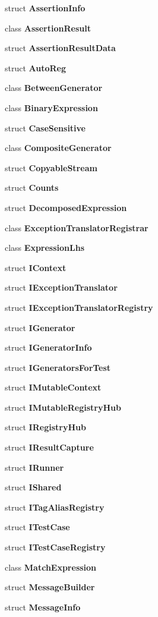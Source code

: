 \begin{DoxyCompactItemize}
\item 
struct \textbf{ Assertion\+Info}
\item 
class \textbf{ Assertion\+Result}
\item 
struct \textbf{ Assertion\+Result\+Data}
\item 
struct \textbf{ Auto\+Reg}
\item 
class \textbf{ Between\+Generator}
\item 
class \textbf{ Binary\+Expression}
\item 
struct \textbf{ Case\+Sensitive}
\item 
class \textbf{ Composite\+Generator}
\item 
struct \textbf{ Copyable\+Stream}
\item 
struct \textbf{ Counts}
\item 
struct \textbf{ Decomposed\+Expression}
\item 
class \textbf{ Exception\+Translator\+Registrar}
\item 
class \textbf{ Expression\+Lhs}
\item 
struct \textbf{ I\+Context}
\item 
struct \textbf{ I\+Exception\+Translator}
\item 
struct \textbf{ I\+Exception\+Translator\+Registry}
\item 
struct \textbf{ I\+Generator}
\item 
struct \textbf{ I\+Generator\+Info}
\item 
struct \textbf{ I\+Generators\+For\+Test}
\item 
struct \textbf{ I\+Mutable\+Context}
\item 
struct \textbf{ I\+Mutable\+Registry\+Hub}
\item 
struct \textbf{ I\+Registry\+Hub}
\item 
struct \textbf{ I\+Result\+Capture}
\item 
struct \textbf{ I\+Runner}
\item 
struct \textbf{ I\+Shared}
\item 
struct \textbf{ I\+Tag\+Alias\+Registry}
\item 
struct \textbf{ I\+Test\+Case}
\item 
struct \textbf{ I\+Test\+Case\+Registry}
\item 
class \textbf{ Match\+Expression}
\item 
struct \textbf{ Message\+Builder}
\item 
struct \textbf{ Message\+Info}

\end{DoxyCompactItemize}
